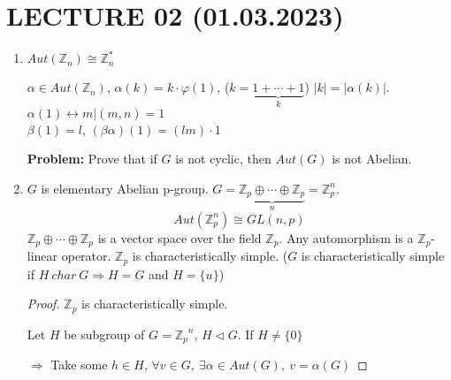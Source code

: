 \documentclass[12pt, a4paper]{article}
\theoremstyle{definition}
\begin{document}
\section{LECTURE 02 (01.03.2023)}
\begin{enumerate}
    \item $Aut({\mathbb{Z}}_n)\cong {\mathbb{Z}}_n^* $
    \par
    $\alpha \in Aut({\mathbb{Z}}_n)$, $\alpha (k)=k\cdot \varphi(1) $, 
    ($k = \underbrace{1+\cdots +1}_k $) $|k|=|\alpha(k)| $. 
    $\alpha(1) \leftrightarrow{m|(m,n) =1} $\\
    $\beta (1)= l$, $(\beta\alpha)(1) = (lm)\cdot 1$
    \par
    \textbf{Problem:} Prove that if $G$ is not cyclic, then $Aut(G)$ is not Abelian.
    \item $G$ is elementary Abelian p-group. $G=\underbrace{{\mathbb{Z}}_p \oplus 
    \cdots \oplus {\mathbb{Z}}_p}_n= {\mathbb{Z}}_p^n$. 
    \[Aut({\mathbb{Z}}_p^n)\cong GL(n,p) \]
    ${\mathbb{Z}}_p \oplus \cdots \oplus {\mathbb{Z}}_p $ is a vector space over the field 
    ${\mathbb{Z}_p}$. Any automorphism is a ${\mathbb{Z}}_p $-linear operator. 
    ${\mathbb{Z}}_p $ is characteristically simple. ($G$ is characteristically simple if 
    $H\ char\ G \Rightarrow H=G$ and $H=\{u\}$)
    \begin{proof}
        ${\mathbb{Z}}_p$ is characteristically simple.
        \par
        Let $H$ be subgroup of $G={{\mathbb{Z}}_p}^n $, $H\lhd G $. If $H\neq \{0\} $\par
        $\Rightarrow$ Take some $h \in H $,
        $\forall v\in G,\ \exists \alpha \in Aut(G),\ v = \alpha(G)$ 
        \par
    \end{proof}
\end{enumerate}
\end{document}
